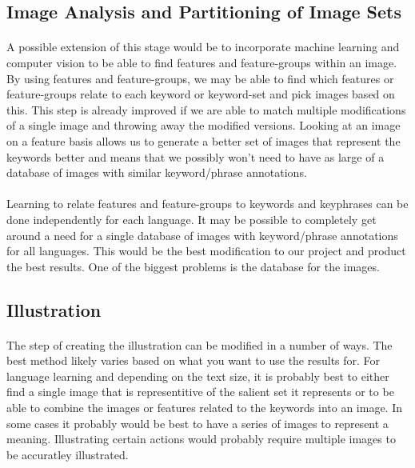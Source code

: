 \documentclass[12pt]{article}
\begin{document}
\subsection{Image Analysis and Partitioning of Image Sets}
\paragraph{}
A possible extension of this stage would be to incorporate machine learning and computer vision to be able to find 
features and feature-groups within an image. By using features and feature-groups, we may be able to find which features 
or feature-groups relate to each keyword or keyword-set and pick images based on this. This step is already improved 
if we are able to match multiple modifications of a single image and throwing away the modified versions. Looking at 
an image on a feature basis allows us to generate a better set of images that represent the keywords better and means 
that we possibly won't need to have as large of a database of images with similar keyword/phrase annotations.
\paragraph{}
Learning to relate features and feature-groups to keywords and keyphrases can be done independently for each language. 
It may be possible to completely get around a need for a single database of images with keyword/phrase annotations 
for all languages. This would be the best modification to our project and product the best results. One of the biggest 
problems is the database for the images.

\subsection{Illustration}
\paragraph{}
The step of creating the illustration can be modified in a number of ways. The best method likely varies based on what 
you want to use the results for. For language learning and depending on the text size, it is probably best to either 
find a single image that is representitive of the salient set it represents or to be able to combine the images or 
features related to the keywords into an image. In some cases it probably would be best to have a series of images 
to represent a meaning. Illustrating certain actions would probably require multiple images to be accuratley 
illustrated.
\end{document}
